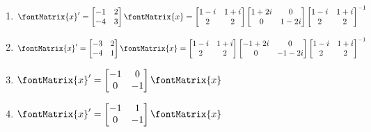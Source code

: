 \begin{enumerate}[label=(\alph*)]
\item\label{itm : Exam4Q2i} $\displaystyle \fontMatrix{x}' = \begin{bmatrix}-1&2\\-4&3\end{bmatrix} \fontMatrix{x} = \begin{bmatrix}1 - i&1 + i\\2&2\end{bmatrix} \begin{bmatrix}1 + 2 i&0\\0&1 - 2 i\end{bmatrix} \begin{bmatrix}1 - i&1 + i\\2&2\end{bmatrix}^{-1}$
\item\label{itm : Exam4Q2j} $\displaystyle \fontMatrix{x}' = \begin{bmatrix}-3&2\\-4&1\end{bmatrix} \fontMatrix{x} = \begin{bmatrix}1 - i&1 + i\\2&2\end{bmatrix} \begin{bmatrix}-1 + 2 i&0\\0&-1 - 2 i\end{bmatrix} \begin{bmatrix}1 - i&1 + i\\2&2\end{bmatrix}^{-1}$
\item\label{itm : Exam4Q2k} $\displaystyle \fontMatrix{x}' = \begin{bmatrix}-1&0\\0&-1\end{bmatrix} \fontMatrix{x}$
\item\label{itm : Exam4Q2l} $\displaystyle \fontMatrix{x}' = \begin{bmatrix}-1&1\\0&-1\end{bmatrix} \fontMatrix{x}$
\end{enumerate}


